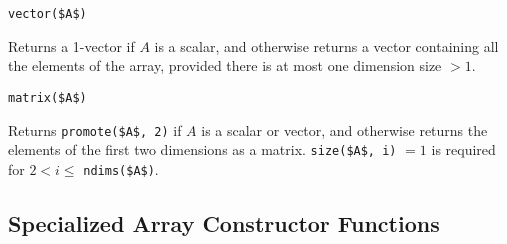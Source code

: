 \begin{operatordefinition}[vector]
\begin{synopsis}\begin{lstlisting}
vector($A$)
\end{lstlisting}\end{synopsis}
\begin{semantics}
Returns a 1-vector if $A$ is a scalar, and otherwise returns a vector containing all the elements of the array, provided there is at most one dimension size $> 1$.
\end{semantics}
\end{operatordefinition}

\begin{operatordefinition}[matrix]
\begin{synopsis}\begin{lstlisting}
matrix($A$)
\end{lstlisting}\end{synopsis}
\begin{semantics}
Returns \lstinline!promote($A$, 2)! if $A$ is a scalar or vector, and otherwise returns the elements of the first two dimensions as a matrix.  \lstinline!size($A$, i)! $= 1$ is required for $2 < i \leq$ \lstinline!ndims($A$)!.
\end{semantics}
\end{operatordefinition}

\subsection{Specialized Array Constructor Functions}\label{specialized-array-constructor-functions}

